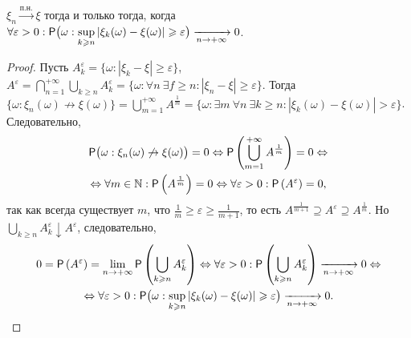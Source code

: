  \begin{lemma}
 	$\xi_n \xrightarrow{\text{п.н.}} \xi$ тогда и только тогда, когда $\forall \varepsilon > 0: \mathsf{P} \big(\omega: \sup\limits_{k \geqslant n} | \xi_k(\omega) - \xi(\omega) | \geqslant \varepsilon \big) \xrightarrow[n \rightarrow + \infty]{} 0$.
 	\begin{proof}
 		Пусть $A_k^\varepsilon = \big\{ \omega: | \xi_k - \xi | \geqslant \varepsilon \big\}$, $A^\varepsilon = \bigcap\limits_{n=1}^{+\infty} \bigcup\limits_{k \geqslant n} A_k^\varepsilon = \big\{\omega: \forall n~ \exists f \geqslant n: |\xi_n - \xi| \geqslant \varepsilon \big\}$. Тогда $\big\{ \omega: \xi_n (\omega) \not\rightarrow \xi(\omega) \big\} = \bigcup\limits_{m=1}^{+\infty} A^{\frac{1}{m}} = \big\{\omega: \exists m~ \forall n~ \exists k \geqslant n: | \xi_k(\omega) - \xi(\omega) | > \varepsilon \big\}$. Следовательно, 
 		\begin{multline*}
 			\mathsf{P} \big( \omega: \xi_n(\omega) \not\rightarrow \xi(\omega) \big) = 0 \Leftrightarrow \mathsf{P} \left( \bigcup\limits_{m = 1}^{+\infty} A^{\frac{1}{m}} \right) = 0 \Leftrightarrow \\ \Leftrightarrow \forall m \in \mathbb{N} : \mathsf{P} \left( A^{\frac{1}{m}} \right) = 0  \Leftrightarrow \forall \varepsilon > 0 : \mathsf{P}  \left( A^\varepsilon \right) = 0,
 		\end{multline*}
 		так как всегда существует $m$, что $\frac{1}{m} \geqslant \varepsilon \geqslant \frac{1}{m+1}$, то есть $A^{\frac{1}{m+1}} \supseteq A^\varepsilon \supseteq A^{\frac{1}{m}}$. Но $\bigcup\limits_{k \geqslant n} A^\varepsilon_k \downarrow A^\varepsilon$, следовательно, 
 		\begin{multline*}
 			0 = \mathsf{P} \left( A^\varepsilon \right) = 
 			\lim\limits_{n \rightarrow + \infty} \mathsf{P} \left( \bigcup_{k \geqslant n} A^\varepsilon_k \right) \Leftrightarrow
 			\forall \varepsilon > 0 : \mathsf{P} \left( \bigcup\limits_{k \geqslant n} A^\varepsilon_k \right) \xrightarrow[n \rightarrow + \infty]{} 0 \Leftrightarrow \\ 
 			\Leftrightarrow  \forall \varepsilon > 0:  \mathsf{P} \big(\omega: \sup\limits_{k \geqslant n} | \xi_k(\omega) - \xi(\omega) | \geqslant \varepsilon \big) \xrightarrow[n \rightarrow + \infty]{} 0.
 		\end{multline*}
 	\end{proof}
 \end{lemma}
